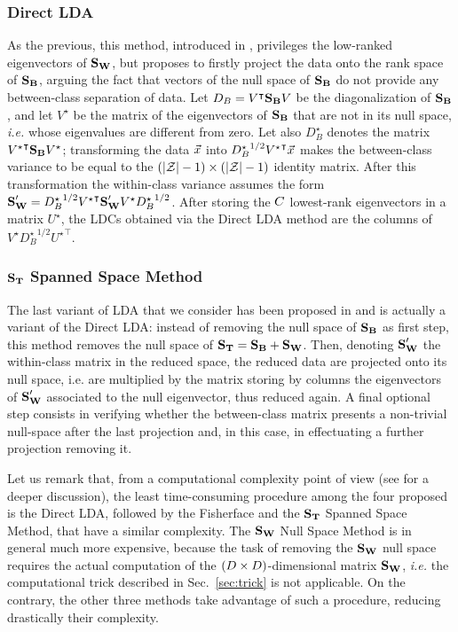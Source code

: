 \subsubsection{Direct LDA}
As the previous, this method, introduced in \cite{Yu01adirect}, privileges the low-ranked eigenvectors of $\textbf{S}_{\textbf{W}}$, but proposes to firstly project the data onto the rank space of $\textbf{S}_{\textbf{B}}$, arguing the fact that vectors of the null space of $\textbf{S}_{\textbf{B}}$ do not provide any between-class separation of data. Let $D_B=V^\intercal\textbf{S}_{\textbf{B}} V$ be the diagonalization of $\textbf{S}_{\textbf{B}}$, and let $V^\star$ be the matrix of the eigenvectors of $\textbf{S}_{\textbf{B}}$ that are not in its null space, \textit{i.e.} whose eigenvalues are different from zero. Let also $D_B^\star$ denotes the matrix ${V^\star}^\intercal\textbf{S}_{\textbf{B}} V^\star$; transforming the data $\vec{x}$ into ${D_B^\star}^{1/2}{V^\star}^\intercal\vec{x}$ makes the between-class variance to be equal to   the $(\lvert\mathcal{Z}\rvert - 1) \times (\lvert\mathcal{Z}\rvert- 1)$ identity matrix. After this transformation the within-class variance assumes the form $\textbf{S}_{\textbf{W}}' = {D_B^\star}^{1/2}{V^\star}^\intercal\textbf{S}_{\textbf{W}} ' V^\star {D_B^\star}^{1/2}$. After storing the $C$ lowest-rank eigenvectors in a matrix $U^\star$, the LDCs obtained via the Direct LDA method are the columns of $V^\star{D_B^\star}^{1/2}{U^\star}^\intercal$. 


\subsubsection{$\textbf{S}_{\textbf{T}}$ Spanned Space Method}
The last variant of LDA that we consider has been proposed in \cite{huang} and is actually a variant of the Direct LDA: instead of removing the null space of $\textbf{S}_{\textbf{B}}$ as first step, this method removes the null space of $\textbf{S}_{\textbf{T}} = \textbf{S}_{\textbf{B}} + \textbf{S}_{\textbf{W}}$. Then, denoting $\textbf{S}_{\textbf{W}}'$ the within-class matrix in the reduced space, the reduced data are projected onto its null space, i.e. are multiplied by the matrix storing by columns the eigenvectors of $\textbf{S}_{\textbf{W}}'$ associated to the null eigenvector, thus reduced again. A final optional step consists in verifying whether  the between-class matrix presents a non-trivial null-space after the last projection and, in this case, in effectuating a further projection removing it.

\begin{remark}
Let us remark that, from a computational complexity point of view (see \cite{huang} for a deeper discussion), the least time-consuming procedure among the four proposed is the Direct LDA, followed by the Fisherface and the $\textbf{S}_{\textbf{T}}$ Spanned Space Method, that have a similar complexity. The $\textbf{S}_{\textbf{W}}$ Null Space Method is in general much more expensive, because the task of removing the $\textbf{S}_{\textbf{W}}$ null space requires the actual computation of the $(D\times D)$-dimensional matrix $\textbf{S}_{\textbf{W}}$, {\em i.e.} the computational trick  described in Sec.~\ref{sec:trick} is not applicable. On the contrary, the other three methods take advantage of such a procedure, reducing drastically their complexity.
\end{remark}



